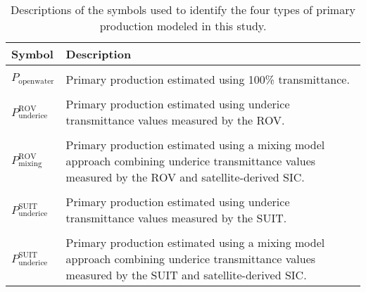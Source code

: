 \documentclass[draft]{agujournal2018}
\begin{document}
\begin{table}[]
	\centering
	\begin{tabular}{l L{12cm}}
		\toprule
		\textbf{Symbol}                             & \textbf{Description}                                                                                                                               \\
		\toprule                                                                                                                                                                                         \\
		$P_\text{openwater}$                & Primary production estimated using 100\% transmittance.                                                                                            \\
		\hline                                                                                                                                                                                           \\
		$P^{\text{ROV}}_{\text{underice}}$  & Primary production estimated using underice transmittance values measured by the ROV.                                                              \\
		\hline                                                                                                                                                                                           \\
		$P^{\text{ROV}}_{\text{mixing}}$    & Primary production estimated using a mixing model approach combining underice transmittance values measured by the ROV and satellite-derived SIC.  \\
		\hline                                                                                                                                                                                           \\
		$P^{\text{SUIT}}_{\text{underice}}$ & Primary production estimated using underice transmittance values measured by the SUIT.                                                             \\
		\hline                                                                                                                                                                                           \\
		$P^{\text{SUIT}}_{\text{underice}}$ & Primary production estimated using a mixing model approach combining underice transmittance values measured by the SUIT and satellite-derived SIC. \\
		\toprule
	\end{tabular}
	\caption{Descriptions of the symbols used to identify the four types of primary production modeled in this study.}
\end{table}
\end{document}
